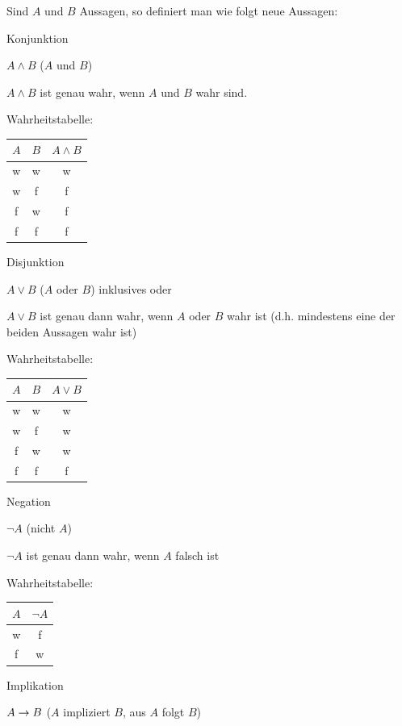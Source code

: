 Sind $A$ und $B$ Aussagen, so definiert man wie folgt neue Aussagen:
\begin{enumerate}
	\begin{minipage}{\linewidth}
		{\bf\item Konjunktion} $A\land B$ ({\flqq $A$ und $B$\frqq})
		
		$A\land B$ ist genau wahr, wenn $A$ und $B$ wahr sind.
		
		Wahrheitstabelle:
		\begin{tabular}{c|c|c}
			$A$ & $B$ & $A\land B$ \\
			\hline w & w & w \\
			w & f & f \\
			f & w & f \\
			f & f & f
		\end{tabular}
	\end{minipage}
	
	\begin{minipage}{\linewidth}
		{\bf\item Disjunktion} $A\lor B$ ({\flqq $A$ oder $B$\frqq}) {\flqq inklusives oder\frqq}
		
		$A\lor B$ ist genau dann wahr, wenn $A$ oder $B$ wahr ist (d.h. mindestens eine der beiden Aussagen wahr ist)
		
		Wahrheitstabelle:
		\begin{tabular}{c|c|c}
			$A$ & $B$ & $A\lor B$ \\
			\hline w & w & w \\
			w & f & w \\
			f & w & w \\
			f & f & f
		\end{tabular}
	\end{minipage}
	
	\begin{minipage}{\linewidth}
		{\bf\item Negation} $\neg A$ ({\flqq nicht $A$\frqq})
		
		$\neg A$ ist genau dann wahr, wenn $A$ falsch ist
		
		Wahrheitstabelle:
		\begin{tabular}{c|c}
			$A$ & $\neg A$ \\
			\hline w & f \\
			f & w
		\end{tabular}
	\end{minipage}
	
	\begin{minipage}{\linewidth}
		{\bf\item Implikation} $A\rightarrow B$ ({\flqq $A$ impliziert $B$\frqq}, {\flqq aus $A$ folgt $B$\frqq})
		

\end{minipage}
\end{enumerate}
